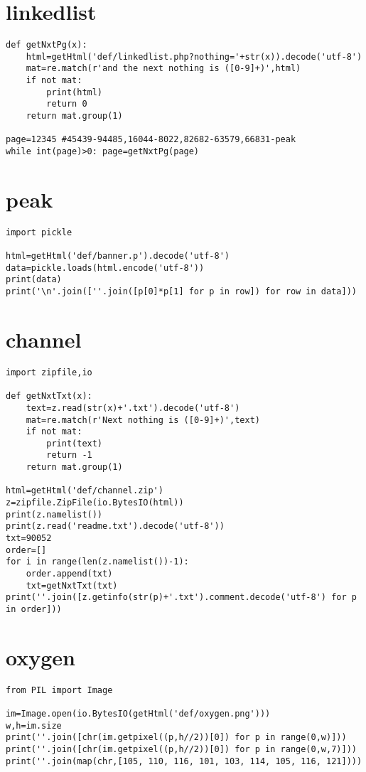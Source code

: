 \documentclass[onecolumn,a4paper,12pt]{article}
\begin{document}
\section{linkedlist}
\begin{lstlisting}
def getNxtPg(x):
    html=getHtml('def/linkedlist.php?nothing='+str(x)).decode('utf-8')
    mat=re.match(r'and the next nothing is ([0-9]+)',html)
    if not mat:
        print(html)
        return 0
    return mat.group(1)

page=12345 #45439-94485,16044-8022,82682-63579,66831-peak
while int(page)>0: page=getNxtPg(page)
\end{lstlisting}

\section{peak}
\begin{lstlisting}
import pickle

html=getHtml('def/banner.p').decode('utf-8')
data=pickle.loads(html.encode('utf-8'))
print(data)
print('\n'.join([''.join([p[0]*p[1] for p in row]) for row in data]))
\end{lstlisting}

\section{channel}
\begin{lstlisting}
import zipfile,io

def getNxtTxt(x):
    text=z.read(str(x)+'.txt').decode('utf-8')
    mat=re.match(r'Next nothing is ([0-9]+)',text)
    if not mat:
        print(text)
        return -1
    return mat.group(1)

html=getHtml('def/channel.zip')
z=zipfile.ZipFile(io.BytesIO(html))
print(z.namelist())
print(z.read('readme.txt').decode('utf-8'))
txt=90052
order=[]
for i in range(len(z.namelist())-1):
    order.append(txt)
    txt=getNxtTxt(txt)
print(''.join([z.getinfo(str(p)+'.txt').comment.decode('utf-8') for p in order]))
\end{lstlisting}

\section{oxygen}
\begin{lstlisting}
from PIL import Image

im=Image.open(io.BytesIO(getHtml('def/oxygen.png')))
w,h=im.size
print(''.join([chr(im.getpixel((p,h//2))[0]) for p in range(0,w)]))
print(''.join([chr(im.getpixel((p,h//2))[0]) for p in range(0,w,7)]))
print(''.join(map(chr,[105, 110, 116, 101, 103, 114, 105, 116, 121])))
\end{lstlisting}
\end{document}
